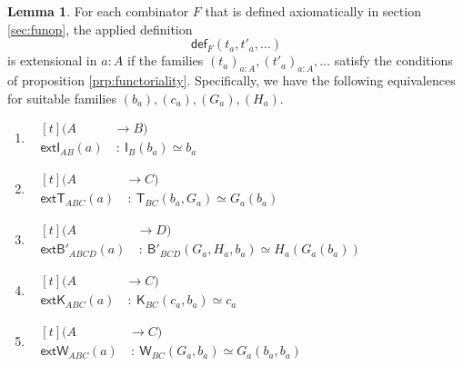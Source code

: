\documentclass[a4paper]{article}
\theoremstyle{definition}
\newtheorem{lemma}[definition]{Lemma}
\theoremstyle{remark}
\renewcommand{\equiv}{\simeq}
\newcommand{\nm}{\mathsf}
\newcommand{\fndef}[1]{\nm{def}_{#1}}
\newcommand{\combinator}{\nm}
\newcommand{\idFun}{\combinator{I}}
\newcommand{\revAppFun}{\combinator{T}}
\newcommand{\constFun}{\combinator{K}}
\newcommand{\compFun}{\combinator{B'}}
\newcommand{\dupFun}{\combinator{W}}
\begin{document}
\begin{lemma}
  \label{lem:combinator-def-equiv}
  For each combinator $F$ that is defined axiomatically in section \ref{sec:funop},
  the applied definition
  \[\fndef{F}(t_a,t'_a,\ldots)\]
  is extensional in $a : A$ if the families $(t_a)_{a : A},(t'_a)_{a : A},\ldots$
  satisfy the conditions of proposition \ref{prp:functoriality}. Specifically, we
  have the following equivalences for suitable families $(b_a),(c_a),(G_a),(H_a)$.
  \begin{enumerate}
    \item \ $\begin{aligned}[t]
                (A   &\to   B)\\
      \nm{extI}_{AB}(a) &\ :\  \idFun_B(b_a) \equiv b_a
    \end{aligned}$
    \item \ $\begin{aligned}[t]
                   (A   &\to   C)\\
      \nm{extT}_{ABC}(a) &\ :\  \revAppFun_{BC}(b_a,G_a) \equiv G_a(b_a)
    \end{aligned}$
    \item \ $\begin{aligned}[t]
                     (A   &\to   D)\\
      \nm{extB'}_{ABCD}(a) &\ :\  \compFun_{BCD}(G_a,H_a,b_a) \equiv H_a(G_a(b_a))
    \end{aligned}$
    \item \ $\begin{aligned}[t]
                   (A   &\to   C)\\
      \nm{extK}_{ABC}(a) &\ :\  \constFun_{BC}(c_a,b_a) \equiv c_a
    \end{aligned}$
    \item \ $\begin{aligned}[t]
                   (A   &\to   C)\\
      \nm{extW}_{ABC}(a) &\ :\  \dupFun_{BC}(G_a,b_a) \equiv G_a(b_a,b_a)
    \end{aligned}$
  \end{enumerate}
\end{lemma}
\end{document}
